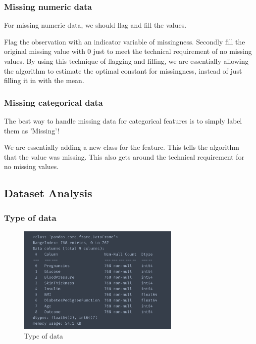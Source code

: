\documentclass[11pt,en]{elegantpaper}
\begin{document}
\subsubsection{Missing numeric data}
For missing numeric data, we should flag and fill the values.

Flag the observation with an indicator variable of missingness.
Secondly fill the original missing value with 0 just to meet the technical requirement of no missing values.
By using this technique of flagging and filling, we are essentially allowing the algorithm to estimate the optimal constant for missingness, instead of just filling it in with the mean.

\subsubsection{Missing categorical data}
The best way to handle missing data for categorical features is to simply label them as ’Missing’!

We are essentially adding a new class for the feature.
This tells the algorithm that the value was missing.
This also gets around the technical requirement for no missing values.

\subsection{Dataset Analysis}

\subsubsection{Type of data}
\begin{figure}[H]
    \centering
    \includegraphics[width=0.7\textwidth]{figure/f0.png}
    \caption{Type of data}
\end{figure}
\end{document}

